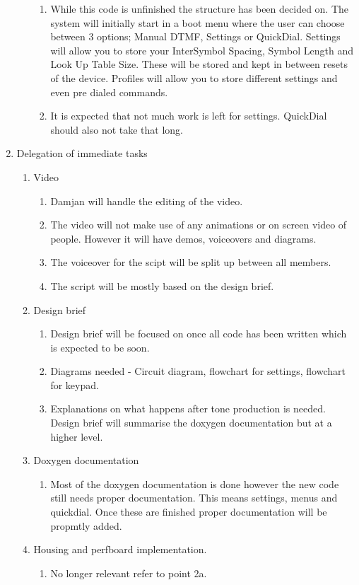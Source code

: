 \documentclass[11pt,a4paper]{scrartcl}
\begin{document}
\begin{enumerate}
\begin{enumerate}
        \begin{enumerate}
            \item While this code is unfinished the structure has been decided on. The system will initially start in a boot menu where the user can choose between 3 options; Manual DTMF, Settings or QuickDial. Settings will allow you to store your InterSymbol Spacing, Symbol Length and Look Up Table Size. These will be stored and kept in between resets of the device. Profiles will allow you to store different settings and even pre dialed commands.
            \item It is expected that not much work is left for settings. QuickDial should also not take that long.
        \end{enumerate}
    \end{enumerate}

\item Delegation of immediate tasks
    \begin{enumerate}
        \item Video
        \begin{enumerate}
            \item Damjan will handle the editing of the video.
            \item The video will not make use of any animations or on screen video of people. However it will have demos, voiceovers and diagrams.
            \item The voiceover for the scipt will be split up between all members.
            \item The script will be mostly based on the design brief.
        \end{enumerate}
        \item Design brief
        \begin{enumerate}
            \item Design brief will be focused on once all code has been written which is expected to be soon.
            \item Diagrams needed - Circuit diagram, flowchart for settings, flowchart for keypad.
            \item Explanations on what happens after tone production is needed. Design brief will summarise the doxygen documentation but at a higher level.
        \end{enumerate}
        \item Doxygen documentation
        \begin{enumerate}
            \item Most of the doxygen documentation is done however the new code still needs proper documentation. This means settings, menus and quickdial. Once these are finished proper documentation will be propmtly added.
        \end{enumerate}
        \item Housing and perfboard implementation.
        \begin{enumerate}
            \item No longer relevant refer to point 2a.
        \end{enumerate}
    \end{enumerate}


\end{enumerate}
\end{document}
